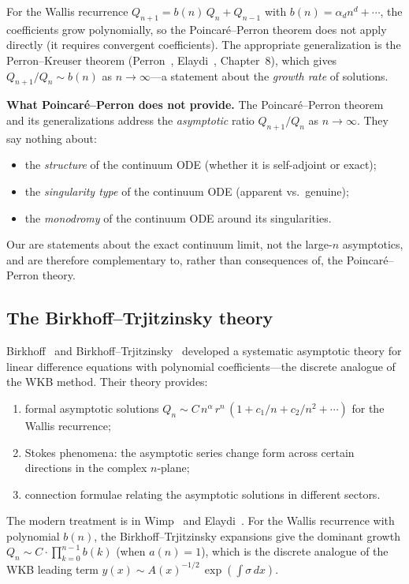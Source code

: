 \documentclass[11pt,a4paper]{amsart}
\theoremstyle{plain}
\theoremstyle{definition}
\theoremstyle{remark}
\begin{document}
For the Wallis recurrence $Q_{n+1} = b(n)\,Q_n + Q_{n-1}$ with
$b(n) = \alpha_d n^d + \cdots$, the coefficients grow
polynomially, so the Poincar\'e--Perron theorem does not apply
directly (it requires convergent coefficients).  The appropriate
generalization is the Perron--Kreuser theorem
(Perron~\cite{Perron21}, Elaydi~\cite{Elaydi05}, Chapter~8),
which gives $Q_{n+1}/Q_n \sim b(n)$ as $n\to\infty$---a
statement about the \emph{growth rate} of solutions.

\textbf{What Poincar\'e--Perron does not provide.}
The Poincar\'e--Perron theorem and its generalizations address
the \emph{asymptotic} ratio $Q_{n+1}/Q_n$ as $n\to\infty$.
They say nothing about:
\begin{itemize}
\item the \emph{structure} of the continuum ODE (whether it is
  self-adjoint or exact);
\item the \emph{singularity type} of the continuum ODE (apparent
  vs.\ genuine);
\item the \emph{monodromy} of the continuum ODE around its
  singularities.
\end{itemize}
Our  are statements about the
exact continuum limit, not the large-$n$ asymptotics, and are
therefore complementary to, rather than consequences of, the
Poincar\'e--Perron theory.

\subsection{The Birkhoff--Trjitzinsky theory}

Birkhoff~\cite{Birkhoff30} and
Birkhoff--Trjitzinsky~\cite{BirkhoffTrjitzinsky32} developed a
systematic asymptotic theory for linear difference equations with
polynomial coefficients---the discrete analogue of the WKB method.
Their theory provides:
\begin{enumerate}[label=(\alph*)]
\item formal asymptotic solutions $Q_n \sim C\,n^\alpha\,r^n\,
  (1 + c_1/n + c_2/n^2 + \cdots)$ for the Wallis recurrence;
\item Stokes phenomena: the asymptotic series change form across
  certain directions in the complex $n$-plane;
\item connection formulae relating the asymptotic solutions in
  different sectors.
\end{enumerate}

The modern treatment is in Wimp~\cite{Wimp81} and
Elaydi~\cite{Elaydi05}.  For the Wallis recurrence with
polynomial $b(n)$, the Birkhoff--Trjitzinsky expansions give
the dominant growth $Q_n \sim C\cdot\prod_{k=0}^{n-1} b(k)$
(when $a(n)=1$), which is the discrete analogue of the WKB
leading term $y(x) \sim A(x)^{-1/2}\,\exp(\int \sigma\,dx)$.
\end{document}
